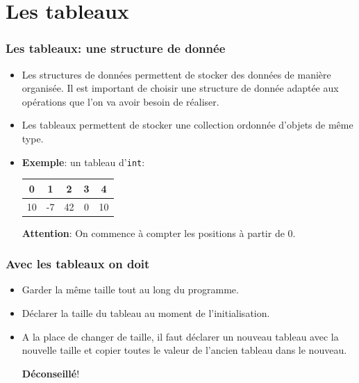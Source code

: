 \documentclass[aspectratio=169]{beamer}
\begin{document}
\section{Les tableaux}

\begin{frame}
  \frametitle{Les tableaux: une structure de donnée}

  \begin{itemize}
  \item Les structures de données permettent de stocker des données de manière
    organisée. Il est important de choisir une structure de donnée adaptée aux
    opérations que l'on va avoir besoin de réaliser.

  \item Les tableaux permettent de stocker une collection ordonnée d'objets de
    même type.

  \item \textbf{Exemple}: un tableau d'\lstinline{int}:
    \begin{tabular}{|c|c|c|c|c|}
      \multicolumn{1}{c}{\footnotesize 0}
      & \multicolumn{1}{c}{\footnotesize 1}
      & \multicolumn{1}{c}{\footnotesize 2}
      & \multicolumn{1}{c}{\footnotesize 3}
      & \multicolumn{1}{c}{\footnotesize 4} \\
      \hline
      10 & -7 & 42 & 0 & 10 \\
      \hline
    \end{tabular}

    \textbf{\alert{Attention}}: On commence à compter les positions à partir de
    0.
  \end{itemize}

\end{frame}


\begin{frame}
  \frametitle{Avec les tableaux on doit}
  \begin{itemize}
  \item Garder la même taille tout au long du programme.
  \item Déclarer la taille du tableau au moment de l'initialisation.
  \item A la place de changer de taille, il faut déclarer un nouveau tableau
    avec la nouvelle taille et copier toutes le valeur de l'ancien tableau dans
    le nouveau.

    \alert{\textbf{Déconseillé}!}
  \end{itemize}

\end{frame}
\end{document}
